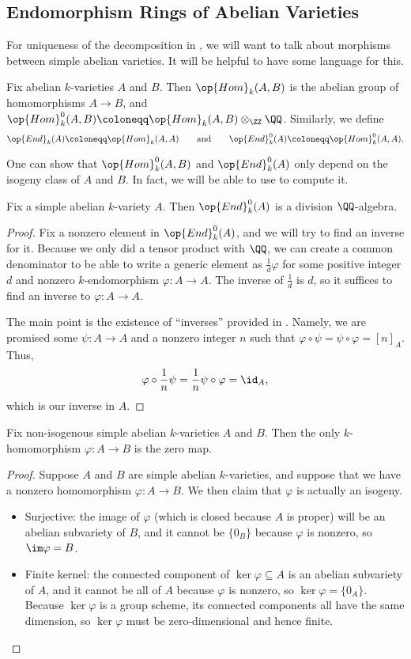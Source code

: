 \documentclass[../notes.tex]{subfiles}
\begin{document}
\subsection{Endomorphism Rings of Abelian Varieties}
For uniqueness of the decomposition in , we will want to talk about morphisms between simple abelian varieties. It will be helpful to have some language for this.
\begin{definition}
	Fix abelian $k$-varieties $A$ and $B$. Then $\op{Hom}_k(A,B)$ is the abelian group of homomorphisms $A\to B$, and $\op{Hom}_k^0(A,B)\coloneqq\op{Hom}_k(A,B)\otimes_\ZZ\QQ$. Similarly, we define
	\[\op{End}_k(A)\coloneqq\op{Hom}_k(A,A)\qquad\text{and}\qquad\op{End}^0_k(A)\coloneqq\op{Hom}_k^0(A,A).\]
\end{definition}
One can show that $\op{Hom}^0_k(A,B)$ and $\op{End}^0_k(A)$ only depend on the isogeny class of $A$ and $B$. In fact, we will be able to use  to compute it.
\begin{corollary} \label{cor:end-a}
	Fix a simple abelian $k$-variety $A$. Then $\op{End}^0_k(A)$ is a division $\QQ$-algebra.
\end{corollary}
\begin{proof}
	Fix a nonzero element in $\op{End}^0_k(A)$, and we will try to find an inverse for it. Because we only did a tensor product with $\QQ$, we can create a common denominator to be able to write a generic element as $\frac1d\varphi$ for some positive integer $d$ and nonzero $k$-endomorphism $\varphi\colon A\to A$. The inverse of $\frac1d$ is $d$, so it suffices to find an inverse to $\varphi\colon A\to A$.

	The main point is the existence of ``inverses'' provided in . Namely, we are promised some $\psi\colon A\to A$ and a nonzero integer $n$ such that $\varphi\circ\psi=\psi\circ\varphi=[n]_A$. Thus,
	\[\varphi\circ\frac1n\psi=\frac1n\psi\circ\varphi=\id_A,\]
	which is our inverse in $A$.
\end{proof}
\begin{corollary} \label{cor:simple-homs}
	Fix non-isogenous simple abelian $k$-varieties $A$ and $B$. Then the only $k$-homomorphism $\varphi\colon A\to B$ is the zero map.
\end{corollary}
\begin{proof}
	Suppose $A$ and $B$ are simple abelian $k$-varieties, and suppose that we have a nonzero homomorphism $\varphi\colon A\to B$. We then claim that $\varphi$ is actually an isogeny.
	\begin{itemize}
		\item Surjective: the image of $\varphi$ (which is closed because $A$ is proper) will be an abelian subvariety of $B$, and it cannot be $\{0_B\}$ because $\varphi$ is nonzero, so $\im\varphi=B$.
		\item Finite kernel: the connected component of $\ker\varphi\subseteq A$ is an abelian subvariety of $A$, and it cannot be all of $A$ because $\varphi$ is nonzero, so $\ker\varphi=\{0_A\}$. Because $\ker\varphi$ is a group scheme, its connected components all have the same dimension, so $\ker\varphi$ must be zero-dimensional and hence finite.
		\qedhere
	\end{itemize}
\end{proof}
\end{document}
